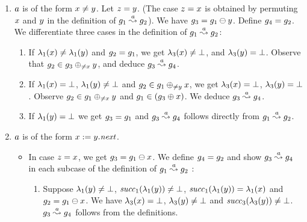 {\begin{enumerate}
\begin{enumerate}
\begin{itemize}
\begin{enumerate}
      from $\graph_1\pmovesto{\action}\graph_2$.
    \end{enumerate}
  \end{itemize}
\item $a$ is of the form $x\neq y$.
  Let $z=y$.
  (The case $z=x$ is obtained 
  by permuting $x$ and $y$ in the definition of 
  $\graph_1\pmovesto{\action}\graph_2$).
  We have $g_3=g_1\ominus{\ensuremath{y}}$.
  Define $g_4=g_2$.
  We differentiate three cases in the 
  definition of $\graph_1\pmovesto{\action}\graph_2$:
  \begin{enumerate}
  \item If $\lambda_1(x)\neq\lambda_1(y)$ 
    and $g_2=g_1$, we get $\lambda_3(x)\neq\bot$, 
    and $\lambda_3(y)=\bot$.
    Observe that $g_2\in g_3\oplus_{\neq{\ensuremath{x}}}{y}$, and 
    deduce $g_3\stackrel{a}{\leadsto}g_4$.
  \item If $\lambda_1(x)=\bot$, 
    $\lambda_1(y)\neq\bot$ and 
    $g_2\in g_1\oplus_{\neq{\ensuremath{y}}}{x}$, we get 
    $\lambda_3(x)=\bot$, 
    $\lambda_3(y)=\bot$.
    Observe $g_2\in g_1\oplus_{\neq{\ensuremath{x}}}{y}$ and 
    $g_1\in\left(g_3\oplus{\ensuremath{x}}\right)$.
    We deduce $g_3\stackrel{a}{\leadsto}g_4$.
  \item If $\lambda_1(y)=\bot$ 
    we get $g_3=g_1$ and 
    $g_3\stackrel{a}{\leadsto}g_4$ 
    follows directly from 
    $\graph_1\pmovesto{\action}\graph_2$.
  \end{enumerate}
\item $a$ is of the form $x:=y.{\it next}$.
%
  \begin{itemize}
  \item In case $z=x$, we get $g_3=g_1\ominus{\ensuremath{x}}$.
    We define $g_4=g_2$ and show 
    $g_3\stackrel{a}{\leadsto}g_4$ in each subcase of the definition of
    $\graph_1\pmovesto{\action}\graph_2$ :  
    \begin{enumerate}
    \item Suppose $\lambda_1(y)\neq\bot$, 
      ${\it succ}_1(\lambda_1(y))\neq\bot$, 
      ${\it succ}_1(\lambda_1(y))=\lambda_1(x)$ and
      $g_2=g_1\ominus{\ensuremath{x}}$.
      We have $\lambda_3(x)=\bot$, %
      $\lambda_3(y)\neq\bot$ and
      ${\it succ}_3(\lambda_3(y))\neq\bot$. 
      $g_3\stackrel{a}{\leadsto}g_4$ follows from the definitions.

\end{enumerate}
\end{itemize}
\end{enumerate}
\end{enumerate}}

